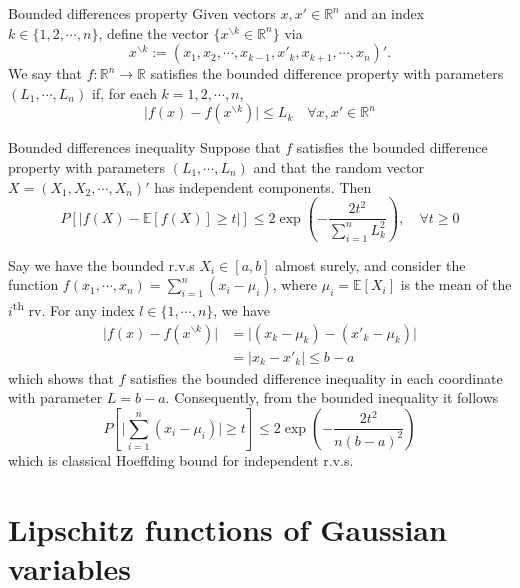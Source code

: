 \documentclass[10pt,handout,english]{beamer}
\newcommand{\ts}{\textsuperscript}
\newcommand{\E}{\mathbb{E}}
\newcommand{\R}{\mathbb{R}}
\begin{document}
\begin{frame}
\begin{block}{Bounded differences property}
Given vectors $x,x'\in\R^n$ and an index $k\in\{1,2,\cdots,n\}$, define the vector $\{x^{\backslash k}\in\R^n\}$ via
\[
x^{\backslash k}:=(x_1,x_2,\cdots,x_{k-1},x'_k,x_{k+1},\cdots,x_n)'.
\]
We say that $f:\R^n\to\R$ satisfies the bounded difference property with parameters $(L_1,\cdots,L_n)$ if, for each $k=1,2,\cdots,n$,
\[
\lvert f(x)-f(x^{\backslash k})\rvert\leq L_k\quad \forall x,x'\in\R^n
\]
\end{block}
\end{frame}
\begin{frame}
\begin{block}{Bounded differences inequality}
Suppose that $f$ satisfies the bounded difference property with parameters $(L_1,\cdots,L_n)$ and that the random vector $X=(X_1,X_2,\cdots,X_n)'$ has independent components. Then
\[
P[\lvert f(X)-\E[f(X)]\geq t\rvert]\leq 2\exp\left(-\frac{2t^2}{\sum_{i=1}^{n}L_k^2}\right),\quad \forall t\geq 0
\]
\end{block}
\end{frame}
\begin{frame}
\begin{example}
Say we have the bounded r.v.s $X_i\in[a,b]$ almost surely, and consider the function $f(x_1,\cdots,x_n)=\sum_{i=1}^n(x_i-\mu_i)$, where $\mu_i=\E[X_i]$ is the mean of the $i$\ts{th} rv. For any index $l\in\{1,\cdots,n\}$, we have
\begin{align*}
\lvert f(x)-f(x^{\backslash k})\rvert&=\lvert (x_k-\mu_k)-(x'_k-\mu_k)\rvert\\
&=\lvert x_k-x'_k\rvert\leq b-a 
\end{align*}
which shows that $f$ satisfies the bounded difference inequality in each coordinate with parameter $L=b-a$. Consequently, from the bounded inequality it follows
\[
P\left[\lvert\sum\limits_{i=1}^{n}(x_i-\mu_i)\rvert\geq t\right]\leq 2\exp\left(-\frac{2t^2}{n(b-a)^2}\right)
\]
which is classical Hoeffding bound for independent r.v.s.
\end{example}
\end{frame}
\section{Lipschitz functions of Gaussian variables}
\frame{\tableofcontents[currentsection]}
\end{document}
